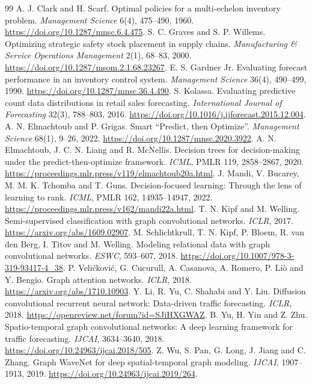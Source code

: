 \documentclass[11pt,a4paper]{article}
\begin{document}
\begin{thebibliography}{99}
 A. J. Clark and H. Scarf. Optimal policies for a multi-echelon inventory problem. \emph{Management Science} 6(4), 475--490, 1960. \url{https://doi.org/10.1287/mnsc.6.4.475}.
 S. C. Graves and S. P. Willems. Optimizing strategic safety stock placement in supply chains. \emph{Manufacturing \& Service Operations Management} 2(1), 68--83, 2000. \url{https://doi.org/10.1287/msom.2.1.68.23267}.
 E. S. Gardner Jr. Evaluating forecast performance in an inventory control system. \emph{Management Science} 36(4), 490--499, 1990. \url{https://doi.org/10.1287/mnsc.36.4.490}.
 S. Kolassa. Evaluating predictive count data distributions in retail sales forecasting. \emph{International Journal of Forecasting} 32(3), 788--803, 2016. \url{https://doi.org/10.1016/j.ijforecast.2015.12.004}.
 A. N. Elmachtoub and P. Grigas. Smart ``Predict, then Optimize''. \emph{Management Science} 68(1), 9--26, 2022. \url{https://doi.org/10.1287/mnsc.2020.3922}.
 A. N. Elmachtoub, J. C. N. Liang and R. McNellis. Decision trees for decision-making under the predict-then-optimize framework. \emph{ICML}, PMLR 119, 2858--2867, 2020. \url{https://proceedings.mlr.press/v119/elmachtoub20a.html}.
 J. Mandi, V. Bucarey, M. M. K. Tchomba and T. Guns. Decision-focused learning: Through the lens of learning to rank. \emph{ICML}, PMLR 162, 14935--14947, 2022. \url{https://proceedings.mlr.press/v162/mandi22a.html}.
 T. N. Kipf and M. Welling. Semi-supervised classification with graph convolutional networks. \emph{ICLR}, 2017. \url{https://arxiv.org/abs/1609.02907}.
 M. Schlichtkrull, T. N. Kipf, P. Bloem, R. van den Berg, I. Titov and M. Welling. Modeling relational data with graph convolutional networks. \emph{ESWC}, 593--607, 2018. \url{https://doi.org/10.1007/978-3-319-93417-4_38}.
 P. Veli\v{c}kovi\'{c}, G. Cucurull, A. Casanova, A. Romero, P. Li\`o and Y. Bengio. Graph attention networks. \emph{ICLR}, 2018. \url{https://arxiv.org/abs/1710.10903}.
 Y. Li, R. Yu, C. Shahabi and Y. Liu. Diffusion convolutional recurrent neural network: Data-driven traffic forecasting. \emph{ICLR}, 2018. \url{https://openreview.net/forum?id=SJiHXGWAZ}.
 B. Yu, H. Yin and Z. Zhu. Spatio-temporal graph convolutional networks: A deep learning framework for traffic forecasting. \emph{IJCAI}, 3634--3640, 2018. \url{https://doi.org/10.24963/ijcai.2018/505}.
 Z. Wu, S. Pan, G. Long, J. Jiang and C. Zhang. Graph WaveNet for deep spatial-temporal graph modeling. \emph{IJCAI}, 1907--1913, 2019. \url{https://doi.org/10.24963/ijcai.2019/264}.

\end{thebibliography}
\end{document}
